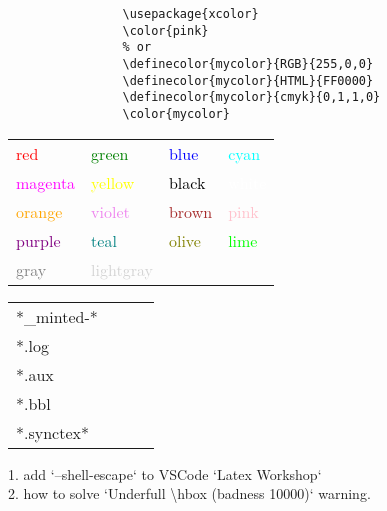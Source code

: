 \documentclass{article}
\begin{document}
\begin{multicols}{2}
\begin{minipage}{0.45\textwidth}
\begin{tcolorbox}[colback=orange!30, colframe=orange!60, title=Custom-color]
            \begin{verbatim}
                \usepackage{xcolor}  
                \color{pink}  
                % or  
                \definecolor{mycolor}{RGB}{255,0,0}
                \definecolor{mycolor}{HTML}{FF0000}
                \definecolor{mycolor}{cmyk}{0,1,1,0}
                \color{mycolor}
            \end{verbatim}
        \end{tcolorbox}
        \begin{tcolorbox}[colback=magenta!30, colframe=magenta!60, title=Color]
            \begin{tabular}{llll}
                \textcolor{red}{red}         & \textcolor{green}{green}         & \textcolor{blue}{blue}   & \textcolor{cyan}{cyan}   \\
                \textcolor{magenta}{magenta} & \textcolor{yellow}{yellow}       & \textcolor{black}{black} & \textcolor{white}{white} \\
                \textcolor{orange}{orange}   & \textcolor{violet}{violet}       & \textcolor{brown}{brown} & \textcolor{pink}{pink}   \\
                \textcolor{purple}{purple}   & \textcolor{teal}{teal}           & \textcolor{olive}{olive} & \textcolor{lime}{lime}   \\
                \textcolor{gray}{gray}       & \textcolor{lightgray}{lightgray} &                          &                          \\
            \end{tabular}
        \end{tcolorbox}
        \begin{tcolorbox}[colback=cyan!30, colframe=cyan!60, title=.gitignore]
            \begin{tabular}{llll}
                *\_minted-* &  &  & \\
                *.log      &  &  & \\
                *.aux      &  &  & \\
                *.bbl      &  &  & \\
                *.synctex* &  &  &
            \end{tabular}
        \end{tcolorbox}

        \begin{tcolorbox}[colback=pink!30, colframe=pink!60, title=Others]
            1. add `--shell-escape` to VSCode `Latex Workshop`  \\
            2. how to solve `Underfull \textbackslash{hbox} (badness 10000)` warning.
        \end{tcolorbox}
    \end{minipage}
\end{multicols}
\end{document}
